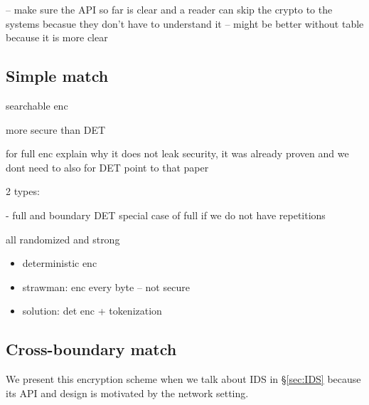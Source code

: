 -- make sure the API so far is clear and a reader can skip the crypto to the systems becasue they don't have
to understand it 
-- might be better without table because it is more clear

\subsection{Simple match}


searchable enc

more secure than DET

for full enc explain why it does not leak security, it was already proven and we dont need to 
also for DET point to that paper 

2 types:

- full and boundary
DET special case of full if we do not have repetitions

all randomized and strong

\begin{itemize}
\item deterministic enc
\item strawman: enc every byte -- not secure
\item solution: det enc + tokenization
\end{itemize}

\subsection{Cross-boundary match}

We present this encryption scheme when we talk about IDS in \S\ref{sec:IDS} because its API and design is
motivated by the network setting.


